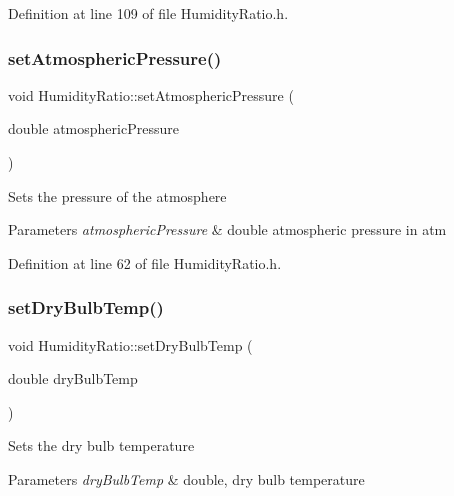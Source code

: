 Definition at line 109 of file Humidity\+Ratio.\+h.

\mbox{\label{class_humidity_ratio_aebab92be0c5eb4f23baaeb7268dad87e}} 
\subsubsection{\texorpdfstring{set\+Atmospheric\+Pressure()}{setAtmosphericPressure()}}
{\footnotesize\ttfamily void Humidity\+Ratio\+::set\+Atmospheric\+Pressure (\begin{DoxyParamCaption}\item[{double}]{atmospheric\+Pressure }\end{DoxyParamCaption})\hspace{0.3cm}{\ttfamily [inline]}}

Sets the pressure of the atmosphere


\begin{DoxyParams}{Parameters}
{\em atmospheric\+Pressure} & double atmospheric pressure in atm \\
\hline
\end{DoxyParams}


Definition at line 62 of file Humidity\+Ratio.\+h.

\mbox{\label{class_humidity_ratio_a291bccce6b8665412987a31bd2633d9a}} 
\subsubsection{\texorpdfstring{set\+Dry\+Bulb\+Temp()}{setDryBulbTemp()}}
{\footnotesize\ttfamily void Humidity\+Ratio\+::set\+Dry\+Bulb\+Temp (\begin{DoxyParamCaption}\item[{double}]{dry\+Bulb\+Temp }\end{DoxyParamCaption})\hspace{0.3cm}{\ttfamily [inline]}}

Sets the dry bulb temperature


\begin{DoxyParams}{Parameters}
{\em dry\+Bulb\+Temp} & double, dry bulb temperature \\
\hline
\end{DoxyParams}


